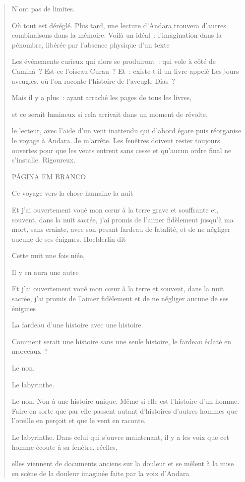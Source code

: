 \begin{quote}
N'ont pas de limites.

Où tout est déréglé. Plus tard, une lecture d'Andara trouvera d'autres
combinaisons dans la mémoire. Voilà un idéal~: l'imagination dans la
pénombre, libérée par l'absence physique d'un texte

Les événements curieux qui alors se produiront~: qui vole à côté de
Caminá~? Est-ce l'oiseau Curau~? Et~: existe-t-il un livre appelé Les
jours aveugles, où l'on raconte l'histoire de l'aveugle Dias~?

Mais il y a plus~: ayant arraché les pages de tous les livres,

et ce serait lumineux si cela arrivait dans un moment de révolte,

le lecteur, avec l'aide d'un vent inattendu qui d'abord égare puis
réorganise le voyage à Andara. Je m'arrête. Les fenêtres doivent rester
toujours ouvertes pour que les vents entrent sans cesse et qu'aucun
ordre final ne s'installe. Rigoureux.

PÁGINA EM BRANCO

Ce voyage vers la chose humaine la nuit

Et j'ai ouvertement voué mon cœur à la terre grave et souffrante et,
souvent, dans la nuit sacrée, j'ai promis de l'aimer fidèlement jusqu'à
ma mort, sans crainte, avec son pesant fardeau de fatalité, et de ne
négliger aucune de ses énigmes. Hoelderlin dit

Cette nuit une fois niée,

Il y en aura une autre

Et j'ai ouvertement voué mon cœur à la terre et souvent, dans la nuit
sacrée, j'ai promis de l'aimer fidèlement et de ne négliger aucune de
ses énigmes

La fardeau d'une histoire avec une histoire.

Comment serait une histoire sans une seule histoire, le fardeau éclaté
en morceaux~?

Le non.

Le labyrinthe.

Le non. Non à une histoire unique. Même si elle est l'histoire d'un
homme. Faire en sorte que par elle passent autant d'histoires d'autres
hommes que l'oreille en perçoit et que le vent en raconte.

Le labyrinthe. Dans celui qui s'ouvre maintenant, il y a les voix que
cet homme écoute à sa fenêtre, réelles,

elles viennent de documents anciens sur la douleur et se mêlent à la
mise en scène de la douleur imaginée faite par la voix d'Andara


\end{quote}

